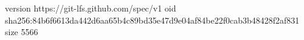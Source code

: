 version https://git-lfs.github.com/spec/v1
oid sha256:84b6f6613da442d6aa65b4c89bd35e47d9e04af84be22f0cab3b48428f2af831
size 5566
